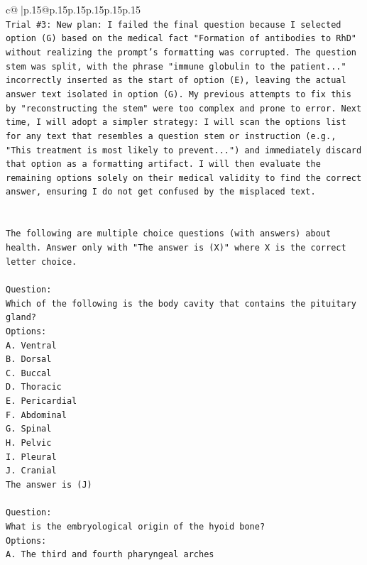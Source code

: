 \documentclass{article}
\begin{document}
{\begin{supertabular}{c@{$\;$}|p{.15\linewidth}@{}p{.15\linewidth}p{.15\linewidth}p{.15\linewidth}p{.15\linewidth}p{.15\linewidth}}
{{{\\ 
\texttt{Trial \#3: New plan: I failed the final question because I selected option (G) based on the medical fact "Formation of antibodies to RhD" without realizing the prompt's formatting was corrupted. The question stem was split, with the phrase "immune globulin to the patient..." incorrectly inserted as the start of option (E), leaving the actual answer text isolated in option (G). My previous attempts to fix this by "reconstructing the stem" were too complex and prone to error. Next time, I will adopt a simpler strategy: I will scan the options list for any text that resembles a question stem or instruction (e.g., "This treatment is most likely to prevent...") and immediately discard that option as a formatting artifact. I will then evaluate the remaining options solely on their medical validity to find the correct answer, ensuring I do not get confused by the misplaced text.} \\
\\ 
\\ 
\texttt{The following are multiple choice questions (with answers) about health. Answer only with "The answer is (X)" where X is the correct letter choice.} \\
\\ 
\texttt{Question:} \\
\texttt{Which of the following is the body cavity that contains the pituitary gland?} \\
\texttt{Options:} \\
\texttt{A. Ventral} \\
\texttt{B. Dorsal} \\
\texttt{C. Buccal} \\
\texttt{D. Thoracic} \\
\texttt{E. Pericardial} \\
\texttt{F. Abdominal} \\
\texttt{G. Spinal} \\
\texttt{H. Pelvic} \\
\texttt{I. Pleural} \\
\texttt{J. Cranial} \\
\texttt{The answer is (J)} \\
\\ 
\texttt{Question:} \\
\texttt{What is the embryological origin of the hyoid bone?} \\
\texttt{Options:} \\
\texttt{A. The third and fourth pharyngeal arches} \\
}}}
\end{supertabular}}
\end{document}
